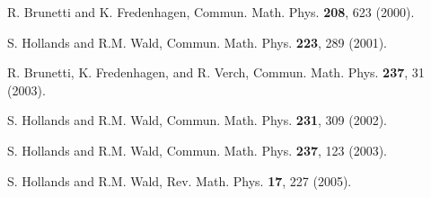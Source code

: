 \documentclass[12pt,epsf,amsfonts,amssymb]{article}
\begin{document}
\begin{thebibliography}{99}
 R. Brunetti and K. Fredenhagen,
Commun. Math. Phys. {\bf 208}, 623 (2000).

 S. Hollands and R.M. Wald,
Commun. Math. Phys. {\bf 223}, 289 (2001).

 R. Brunetti, K. Fredenhagen, and R. Verch,
Commun. Math. Phys. {\bf 237}, 31 (2003).

 S. Hollands and R.M. Wald,
Commun. Math. Phys. {\bf 231}, 309 (2002).

 S. Hollands and R.M. Wald,
Commun. Math. Phys. {\bf 237}, 123 (2003).

 S. Hollands and R.M. Wald,
Rev. Math. Phys. {\bf 17}, 227 (2005).

\end{thebibliography}
\end{document}
